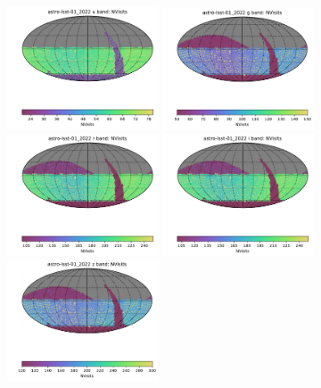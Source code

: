 \documentclass[DM,lsstdraft,authoryear,toc]{lsstdoc}
\begin{document}
\begin{figure}[ht]
\centering
\includegraphics[width=0.4\textwidth]{figures/astro-lsst-01_2022_NVisits_u_band_HEAL_SkyMap}
\includegraphics[width=0.4\textwidth]{figures/astro-lsst-01_2022_NVisits_g_band_HEAL_SkyMap} \\
\includegraphics[width=0.4\textwidth]{figures/astro-lsst-01_2022_NVisits_r_band_HEAL_SkyMap}
\includegraphics[width=0.4\textwidth]{figures/astro-lsst-01_2022_NVisits_i_band_HEAL_SkyMap} \\
\includegraphics[width=0.4\textwidth]{figures/astro-lsst-01_2022_NVisits_z_band_HEAL_SkyMap}

\end{figure}
\end{document}
